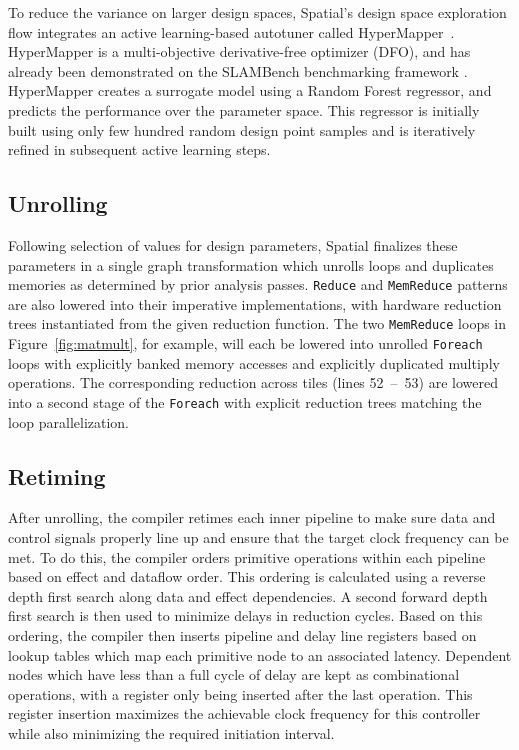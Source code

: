 {To reduce the variance on larger design spaces, Spatial's design space exploration flow integrates an active learning-based autotuner called HyperMapper~\cite{Bodin2016:PACT16,NardiBSVDK17,Saeedi_ICRA_2017}.
HyperMapper is a multi-objective derivative-free optimizer (DFO), and has already been demonstrated on the SLAMBench benchmarking framework \cite{nardi2015introducing}. 
HyperMapper creates a surrogate model using a Random Forest regressor, and predicts the performance over the parameter space. This regressor is initially built using only few hundred random design point samples and is iteratively refined in subsequent active learning steps.


\subsection{Unrolling}
Following selection of values for design parameters, Spatial finalizes these parameters in a single graph transformation which unrolls loops and duplicates memories as determined by prior analysis passes. 
\texttt{Reduce} and \texttt{MemReduce} patterns are also lowered into their imperative implementations, with hardware reduction trees instantiated from the given reduction function. 
The two \texttt{MemReduce} loops in Figure~\ref{fig:matmult}, for example, will each be lowered into unrolled \texttt{Foreach} loops with explicitly banked memory accesses and explicitly duplicated multiply operations. The corresponding reduction across tiles (lines 52~--~53) are lowered into a second stage of the \texttt{Foreach} with explicit reduction trees matching the loop parallelization. 

\subsection{Retiming}
After unrolling, the compiler retimes each inner pipeline to make sure data and control signals properly line up and ensure that the target clock frequency can be met.
To do this, the compiler orders primitive operations within each pipeline based on effect and dataflow order.
This ordering is calculated using a reverse depth first search along data and effect dependencies. 
A second forward depth first search is then used to minimize delays in reduction cycles.
Based on this ordering, the compiler then inserts pipeline and delay line registers based on lookup tables which map each primitive node to an associated latency. Dependent nodes which have less than a full cycle of delay are kept as combinational operations, with a register only being inserted after the last operation.
This register insertion maximizes the achievable clock frequency for this controller while also minimizing the required initiation interval.

}
